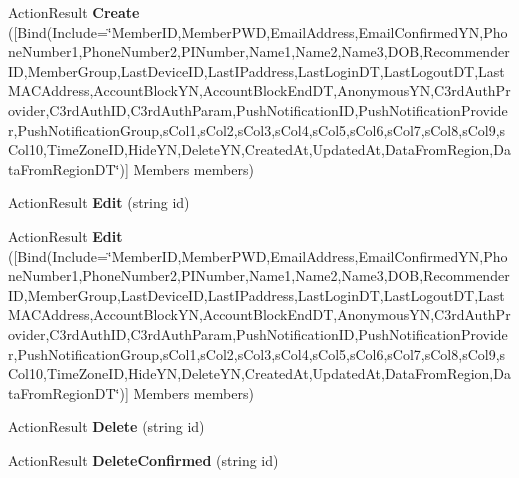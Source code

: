 \begin{DoxyCompactItemize}
\item 
Action\+Result {\bfseries Create} (\mbox{[}Bind(Include=\char`\"{}Member\+ID,Member\+P\+WD,Email\+Address,Email\+Confirmed\+YN,Phone\+Number1,Phone\+Number2,P\+I\+Number,Name1,Name2,Name3,D\+OB,Recommender\+ID,Member\+Group,Last\+Device\+ID,Last\+I\+Paddress,Last\+Login\+DT,Last\+Logout\+DT,Last\+M\+A\+C\+Address,Account\+Block\+YN,Account\+Block\+End\+DT,Anonymous\+YN,C3rd\+Auth\+Provider,C3rd\+Auth\+ID,C3rd\+Auth\+Param,Push\+Notification\+ID,Push\+Notification\+Provider,Push\+Notification\+Group,s\+Col1,s\+Col2,s\+Col3,s\+Col4,s\+Col5,s\+Col6,s\+Col7,s\+Col8,s\+Col9,s\+Col10,Time\+Zone\+ID,Hide\+YN,Delete\+YN,Created\+At,Updated\+At,Data\+From\+Region,Data\+From\+Region\+DT\char`\"{})\mbox{]} Members members)\hypertarget{class_cloud_bread_admin_web_1_1_controllers_1_1_members_controller_aa9708584a1c400fa3f47df43d53f364b}{}\label{class_cloud_bread_admin_web_1_1_controllers_1_1_members_controller_aa9708584a1c400fa3f47df43d53f364b}

\item 
Action\+Result {\bfseries Edit} (string id)\hypertarget{class_cloud_bread_admin_web_1_1_controllers_1_1_members_controller_a8db961e69156f60f3be73521f9db2a92}{}\label{class_cloud_bread_admin_web_1_1_controllers_1_1_members_controller_a8db961e69156f60f3be73521f9db2a92}

\item 
Action\+Result {\bfseries Edit} (\mbox{[}Bind(Include=\char`\"{}Member\+ID,Member\+P\+WD,Email\+Address,Email\+Confirmed\+YN,Phone\+Number1,Phone\+Number2,P\+I\+Number,Name1,Name2,Name3,D\+OB,Recommender\+ID,Member\+Group,Last\+Device\+ID,Last\+I\+Paddress,Last\+Login\+DT,Last\+Logout\+DT,Last\+M\+A\+C\+Address,Account\+Block\+YN,Account\+Block\+End\+DT,Anonymous\+YN,C3rd\+Auth\+Provider,C3rd\+Auth\+ID,C3rd\+Auth\+Param,Push\+Notification\+ID,Push\+Notification\+Provider,Push\+Notification\+Group,s\+Col1,s\+Col2,s\+Col3,s\+Col4,s\+Col5,s\+Col6,s\+Col7,s\+Col8,s\+Col9,s\+Col10,Time\+Zone\+ID,Hide\+YN,Delete\+YN,Created\+At,Updated\+At,Data\+From\+Region,Data\+From\+Region\+DT\char`\"{})\mbox{]} Members members)\hypertarget{class_cloud_bread_admin_web_1_1_controllers_1_1_members_controller_a806d803f2234b493bc5c6f4bfe64e57f}{}\label{class_cloud_bread_admin_web_1_1_controllers_1_1_members_controller_a806d803f2234b493bc5c6f4bfe64e57f}

\item 
Action\+Result {\bfseries Delete} (string id)\hypertarget{class_cloud_bread_admin_web_1_1_controllers_1_1_members_controller_a7cf4b841a01950d27b69785f2255c854}{}\label{class_cloud_bread_admin_web_1_1_controllers_1_1_members_controller_a7cf4b841a01950d27b69785f2255c854}

\item 
Action\+Result {\bfseries Delete\+Confirmed} (string id)\hypertarget{class_cloud_bread_admin_web_1_1_controllers_1_1_members_controller_a4fda262d2c527a8326a19f751923f518}{}\label{class_cloud_bread_admin_web_1_1_controllers_1_1_members_controller_a4fda262d2c527a8326a19f751923f518}

\end{DoxyCompactItemize}

